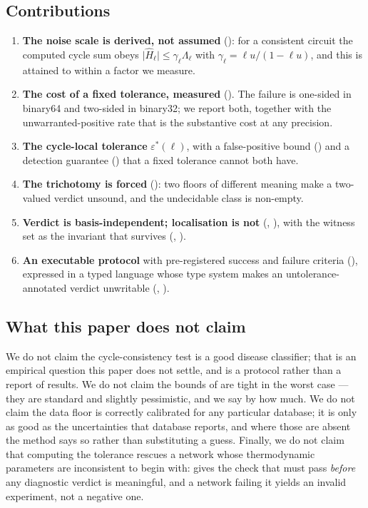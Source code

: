 \documentclass[11pt,twocolumn,a4paper]{article}
\theoremstyle{pstyle}
\theoremstyle{definition}
\theoremstyle{remark}
\newcommand{\abs}[1]{\lvert#1\rvert}
\newcommand{\eps}{\varepsilon}
\newcommand{\epsstar}{\eps^{\ast}}
\newcommand{\hol}{H}
\newcommand{\mach}{u}
\begin{document}
\subsection{Contributions}

\begin{enumerate}[leftmargin=1.5em,itemsep=3pt]
\item \textbf{The noise scale is derived, not assumed}
(): for a consistent circuit the computed cycle
sum obeys $\abs{\widehat{\hol}_\ell} \le \gamma_\ell \Lambda_\ell$ with
$\gamma_\ell = \ell\mach/(1-\ell\mach)$, and this is attained to within
a factor we measure.
\item \textbf{The cost of a fixed tolerance, measured}
(). The failure is one-sided in binary64
and two-sided in binary32; we report both, together with the
unwarranted-positive rate that is the substantive cost at any
precision.
\item \textbf{The cycle-local tolerance} $\epsstar(\ell)$, with a
false-positive bound () and a detection
guarantee () that a fixed tolerance cannot both
have.
\item \textbf{The trichotomy is forced} (): two
floors of different meaning make a two-valued verdict unsound, and the
undecidable class is non-empty.
\item \textbf{Verdict is basis-independent; localisation is not}
(, ), with the
witness set as the invariant that survives
(, ).
\item \textbf{An executable protocol} with pre-registered success and
failure criteria (), expressed in a typed language
whose type system makes an untolerance-annotated verdict unwritable
(, ).
\end{enumerate}

\subsection{What this paper does not claim}
\label{sec:notclaim}

We do not claim the cycle-consistency test is a good disease classifier;
that is an empirical question this paper does not settle, and
 is a protocol rather than a report of results. We do
not claim the bounds of  are tight in the
worst case --- they are standard and slightly pessimistic, and we say by
how much. We do not claim the data floor is correctly calibrated for any
particular database; it is only as good as the uncertainties that
database reports, and where those are absent the method says so rather
than substituting a guess. Finally, we do not claim that computing the
tolerance rescues a network whose thermodynamic parameters are
inconsistent to begin with:  gives the check that
must pass \emph{before} any diagnostic verdict is meaningful, and a
network failing it yields an invalid experiment, not a negative one.
\end{document}
